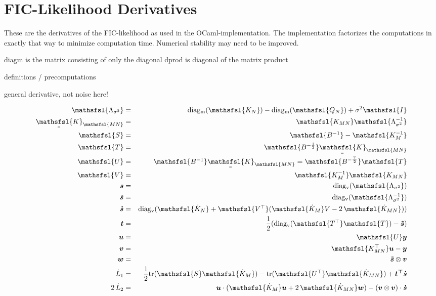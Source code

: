 \documentclass[12pt]{article}
\newcommand{\myu}[1]{\underaccent{\bar}{#1}}
\newcommand{\mat}[1]{\mbox{$\mathsfsl{#1}$}}
\renewcommand{\vec}[1]{\mbox{\boldmath$#1$}}
\newcommand{\diagv}[1]{\mathrm{diag_v}(#1)}
\newcommand{\diagm}[1]{\mathrm{diag_m}(#1)}
\newcommand{\trace}[1]{\mathrm{tr}(#1)}
\newcommand{\transv}[1]{\vec{#1^\top}}
\newcommand{\transm}[1]{\mat{#1^\top}}
\newcommand{\imat}[1]{\mat{#1^{-1}}}
\newcommand{\ichol}[1]{\mat{#1^{-\frac{1}{2}}}}
\newcommand{\icholt}[1]{\mat{#1^{-\frac{\top}{2}}}}
\newcommand{\iKm}{\imat{K_M}}
\newcommand{\dKm}{\mat{\dot{K}_M}}
\newcommand{\dkn}{\mat{\dot{K}_N}}
\newcommand{\Kmn}{\mat{K_{MN}}}
\newcommand{\Knm}{\transm{K_{MN}}}
\newcommand{\dKmn}{\mat{\dot{K}_{MN}}}
\newcommand{\uuKmn}{\myu{\myu{\mat{K}}}_{\mathsfsl{MN}}}
\newcommand{\vecs}{\vec{s}}
\newcommand{\vect}{\vec{t}}
\newcommand{\vecu}{\vec{u}}
\newcommand{\vecv}{\vec{v}}
\newcommand{\vecw}{\vec{w}}
\newcommand{\vecy}{\vec{y}}
\newcommand{\vecsd}{\vec{\dot{s}}}
\newcommand{\vecsi}{\vec{\tilde{s}}}
\newcommand{\matS}{\mat{S}}
\newcommand{\matT}{\mat{T}}
\newcommand{\matU}{\mat{U}}
\newcommand{\matV}{\mat{V}}
\newcommand{\Lamss}{\mat{\Lambda_{\sigma^2}}}
\newcommand{\Lamssi}{\mat{\Lambda_{\sigma^2}^{-1}}}
\begin{document}
\section{FIC-Likelihood Derivatives}

These are the derivatives of the FIC-likelihood as used in the
OCaml-implementation.  The implementation factorizes the computations
in exactly that way to minimize computation time.  Numerical stability
may need to be improved.

diagm is the matrix consisting of only the diagonal
dprod is diagonal of the matrix product

definitions / precomputations

general derivative, not noise here!

\begin{eqnarray*}
\Lamss & = & \diagm{\mat{K_N}} - \diagm{\mat{Q_N}} + \sigma^2\mat{I} \\
\uuKmn & = & \Kmn\Lamssi \\
\matS & = & \imat{B} - \imat{K_M} \\
\matT & = & \ichol{B}\uuKmn \\
\matU & = & \imat{B}\uuKmn = \icholt{B}\matT \\
\matV & = & \iKm\Kmn \\
\vecs & = & \diagv{\Lamss} \\
\vecsi & = & \diagv{\Lamssi} \\
\vecsd & = & \diagv{\dkn + \transm{V}(\dKm V - 2\,\dKmn)} \\
\vect & = & \frac{1}{2}(\diagv{\transm{T}\matT} - \vec{\mathbf{\vecsi}}) \\
\vecu & = & \matU \vecy \\
\vecv & = & \Knm \vecu - \vecy \\
\vecw & = & \vecsi\otimes \vecv \\
\dot{L}_1 & = & \frac{1}{2}\trace{\matS\dKm} - \trace{\transm{U}\dKmn} + \transv{t}\vecsd \\
2\,\dot{L}_2 & = & \vecu\cdot(\dKm \vecu + 2\,\dKmn \vecw) - (\vecv\otimes \vecv)\cdot\vecsd \\
\end{eqnarray*}
\end{document}
